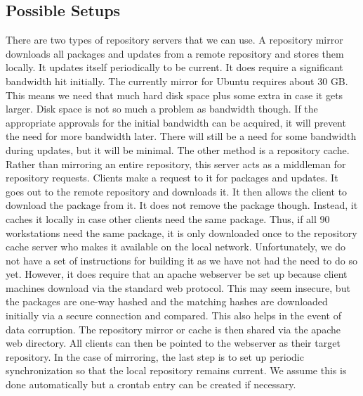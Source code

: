 \subsection{Possible Setups}
There are two types of repository servers that we can use.  A repository mirror downloads all packages and updates from a remote repository and stores them locally.  It updates itself periodically to be current.  It does require a significant bandwidth hit initially.  The currently mirror for Ubuntu requires about 30 GB.  This means we need that much hard disk space plus some extra in case it gets larger.  Disk space is not so much a problem as bandwidth though.  If the appropriate approvals for the initial bandwidth can be acquired, it will prevent the need for more bandwidth later.  There will still be a need for some bandwidth during updates, but it will be minimal.  
The other method is a repository cache.  Rather than mirroring an entire repository, this server acts as a middleman for repository requests.  Clients make a request to it for packages and updates.  It goes out to the remote repository and downloads it.  It then allows the client to download the package from it.  It does not remove the package though.  Instead, it caches it locally in case other clients need the same package.  Thus, if all 90 workstations need the same package, it is only downloaded once to the repository cache server who makes it available on the local network.  
Unfortunately, we do not have a set of instructions for building it as we have not had the need to do so yet.  However, it does require that an apache webserver be set up because client machines download via the standard web protocol.  This may seem insecure, but the packages are one-way hashed and the matching hashes are downloaded initially via a secure connection and compared.  This also helps in the event of data corruption.  The repository mirror or cache is then shared via the apache web directory.  All clients can then be pointed to the webserver as their target repository.  In the case of mirroring, the last step is to set up periodic synchronization so that the local repository remains current.  We assume this is done automatically but a crontab entry can be created if necessary.
